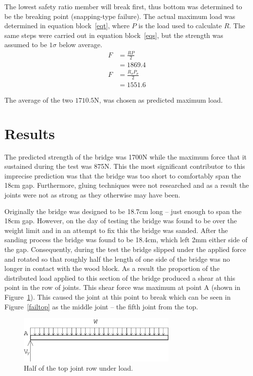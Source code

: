 \documentclass[12pt]{article}
\begin{document}
		The lowest safety ratio member will break first, thus bottom was determined to be the breaking point (snapping-type failure). The actual maximum load was determined in equation block~\ref{eqt}, where $P$ is the load used to calculate $R$. The same steps were carried out in equation block~\ref{eqs}, but the strength was assumed to be $1\sigma$ below average.
		\begin{subequations}
			\begin{align}
				F&=\frac{R P}{2} \\
				&=1869.4
			\end{align}
			\label{eqt}
		\end{subequations}
		\begin{subequations}
			\begin{align}
				F&=\frac{R_{\sigma} P_{\sigma}}{2} \\
				&=1551.6
			\end{align}
			\label{eqs}
		\end{subequations}

		The average of the two $1710.5\mathrm{N}$, was chosen as predicted maximum load.
	\section{Results}
The predicted strength of the bridge was 1700N while the maximum force that it sustained during the test was 875N. This the most significant contributor to this imprecise prediction was that the bridge was too short to comfortably span the 18cm gap. Furthermore, gluing techniques were not researched and as a result the joints were not as strong as they otherwise may have been.

Originally the bridge was designed to be 18.7cm long – just enough to span the 18cm gap. However, on the day of testing the bridge was found to be over the weight limit and in an attempt to fix this the bridge was sanded. After the sanding process the bridge was found to be 18.4cm, which left 2mm either side of the gap. Consequently, during the test the bridge slipped under the applied force and rotated so that roughly half the length of one side of the bridge was no longer in contact with the wood block. As a result the proportion of the distributed load applied to this section of the bridge produced a shear at this point in the row of joints. This shear force was maximum at point A (shown in Figure~\ref{loadtop}). This caused the joint at this point to break which can be seen in Figure~\ref{failtop} as the middle joint – the fifth joint from the top.
		\begin{figure}[h!]
			\centering
			\includegraphics[width=0.7\textwidth]{loadtop}
			\caption{Half of the top joint row under load.}
			\label{loadtop}
		\end{figure}
\end{document}

